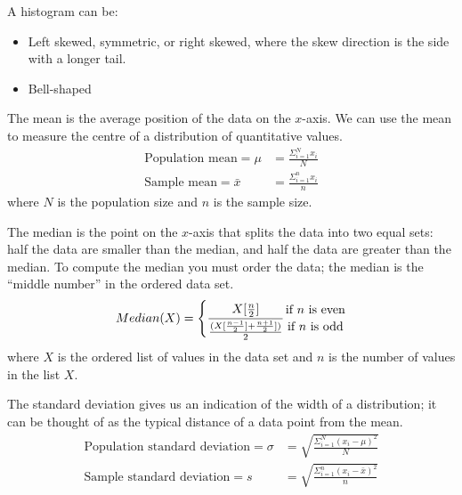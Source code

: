 \documentclass[12pt]{article}
\newcommand*{\bfrac}[2]{\genfrac{}{}{0pt}{}{#1}{#2}}
\begin{document}
\begin{tcolorbox}[title=Histogram Distribution]
    A histogram can be:
    \begin{itemize}
        \item Left skewed, symmetric, or right skewed, where the skew direction is the side with a longer tail.
        \item Bell-shaped
    \end{itemize}
\end{tcolorbox}

\begin{tcolorbox}[title=Mean]
    The mean is the average position of the data on the $x$-axis. We can use the mean to measure the centre of a distribution of quantitative values.
    \begin{align*}
        \text{Population mean} = \mu &= \frac{\Sigma^{N}_{i=1}x_i}{N}\\
        \text{Sample mean} = \bar{x} &= \frac{\Sigma^{n}_{i=1}x_i}{n}
    \end{align*}
    where $N$ is the population size and $n$ is the sample size.
\end{tcolorbox}

\begin{tcolorbox}[title=Median]
    The median is the point on the $x$-axis that splits the data into two equal sets: half the data are smaller than the median, and half the data are greater than the median. To compute the median you must order the data; the median is the “middle number” in the ordered data set.
    \[Median(X) = \Bigg\{\frac{X[\frac{n}{2}]}{\frac{(X[\frac{n-1}{2}]+\frac{n+1}{2}])}{2}} \bfrac{\text{if $n$ is even}}{\text{if $n$ is odd}}\]
    where $X$ is the ordered list of values in the data set and $n$ is the number of values in the list $X$.
\end{tcolorbox}

\begin{tcolorbox}[title=Standard Deviation]
    The standard deviation gives us an indication of the width of a distribution; it can be thought of as the typical distance of a data point from the mean.
    \begin{align*}
        \text{Population standard deviation}= \sigma &= \sqrt{\frac{\Sigma^N_{i=1}(x_i-\mu)^2}{N}}\\
        \text{Sample standard deviation}= s &= \sqrt{\frac{\Sigma^n_{i=1}(x_i-\bar{x})^2}{n}}
    \end{align*}
\end{tcolorbox}
\end{document}
